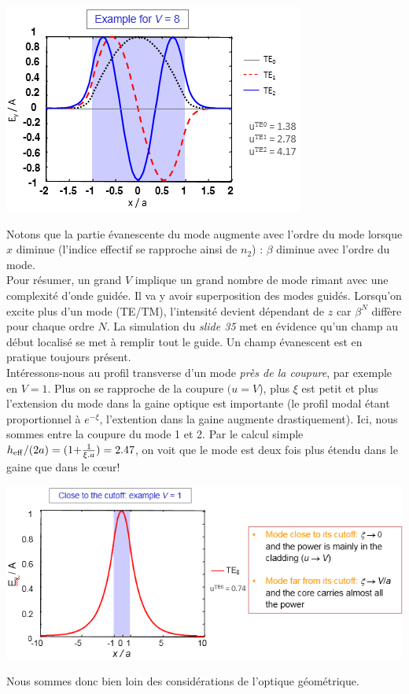 \begin{enumerate}
\begin{center}
	\includegraphics[scale=0.75]{ch1/image16.png}
\end{center}

Notons que la partie évanescente du mode augmente avec l'ordre du mode lorsque $x$ diminue (l'indice
effectif se rapproche ainsi de $n_2$) : $\beta$ diminue avec l'ordre du mode.\\

Pour résumer, un grand $V$ implique un grand nombre de mode rimant avec une complexité d'onde guidée.
Il va y avoir superposition des modes guidés. Lorsqu'on excite plus d'un mode (TE/TM), l'intensité
devient dépendant de $z$ car $\beta^N$ diffère pour chaque ordre $N$. La simulation du \textit{slide 
35} met en évidence qu'un champ au début localisé se met à remplir tout le guide. Un champ évanescent
est en pratique toujours présent.\\

Intéressons-nous au profil transverse d'un mode \textit{près de la coupure}, par exemple en $V=1$. 
Plus on se rapproche de la coupure $(u=V$), plus $\xi$ est petit et plus l'extension du mode dans 
la gaine optique est importante (le profil modal étant proportionnel à $e^{-\xi}$, l'extention dans la
gaine augmente drastiquement). Ici, nous sommes
entre la coupure du mode 1 et 2. Par le calcul simple ${h_{{\rm{eff}}}}/(2a{\rm{)}} = {\rm{(1 + }}
\frac{{\rm{1}}}{{\xi .a}}{\rm{)  =  2}}{\rm{.47}}$, 
on voit que le mode est deux fois plus étendu dans le gaine que dans le cœur!
\begin{center}
	\includegraphics[scale=0.75]{ch1/image17.png}
\end{center}
Nous sommes donc bien loin des considérations de l'optique géométrique. 


\end{enumerate}
